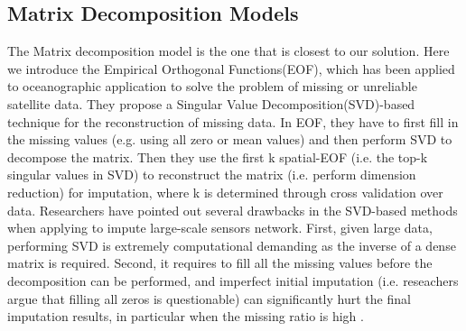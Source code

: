 \subsection{Matrix Decomposition Models}
The Matrix decomposition model is the one that is closest to our solution. Here we introduce the Empirical Orthogonal Functions(EOF), which has been applied to oceanographic application to solve the problem of missing or unreliable satellite data\cite{beckers2003eof}. 
They propose a Singular Value Decomposition(SVD)-based technique for the reconstruction of missing data. In EOF, they have to first fill in the missing values (e.g. using all zero or mean values) and then perform SVD to decompose the matrix. Then they use the first k spatial-EOF (i.e. the top-k singular values in SVD) to reconstruct the matrix (i.e. perform dimension reduction) for imputation, where k is determined through cross validation over data.
Researchers have pointed out several drawbacks in the SVD-based methods when applying to impute large-scale sensors network. First, given large data, performing SVD is extremely computational demanding as the inverse of a dense matrix is required. Second, it requires to fill all the missing values before the decomposition can be performed, and imperfect initial imputation (i.e. reseachers argue that filling all zeros is questionable) can significantly hurt the final imputation results, in particular when the missing ratio is high \cite{koren2009matrix}\cite{ke2005robust}. 
  
